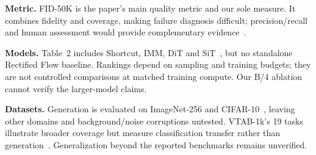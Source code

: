 \textbf{Metric.} FID-50K is the paper's main quality metric and our sole measure. It combines fidelity and coverage, making failure diagnosis difficult; precision/recall and human assessment would provide complementary evidence~\cite{generative-precision-recall}.

\textbf{Models.} Table~2 includes Shortcut, IMM, DiT and SiT~\cite{meanflow}, but no standalone Rectified Flow baseline. Rankings depend on sampling and training budgets; they are not controlled comparisons at matched training compute. Our B/4 ablation cannot verify the larger-model claims.

\textbf{Datasets.} Generation is evaluated on ImageNet-256 and CIFAR-10~\cite{meanflow}, leaving other domains and background/noise corruptions untested. VTAB-1k's 19 tasks illustrate broader coverage but measure classification transfer rather than generation~\cite{vtab}. Generalization beyond the reported benchmarks remains unverified.
